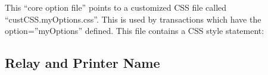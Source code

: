 \documentclass[letterpaper,10pt,english]{sphinxmanual}
\begin{document}

This “core option file” points to a customized CSS file called “custCSS.myOptions.css”. This is used by transactions which have the option=”myOptions” defined. This file contains a CSS style statement:

\begin{sphinxVerbatim}[commandchars=\\\{\}]
\end{sphinxVerbatim}


\ignorespaces 

\subsection{Relay and Printer Name}
\label{\detokenize{Customization:relay-and-printer-name}}\label{\detokenize{Customization:index-44}}
\ignorespaces 
\end{document}
